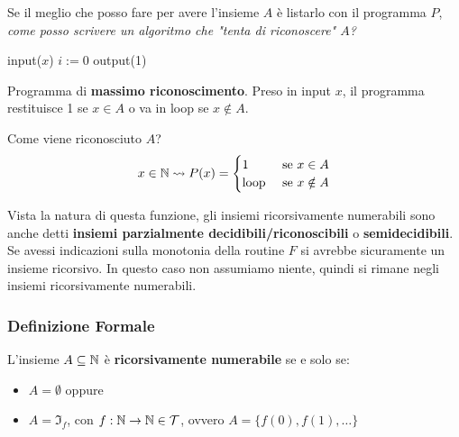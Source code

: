 Se il meglio che posso fare per avere l'insieme $A$ è listarlo con il programma $P$, \textit{come posso scrivere un algoritmo che "tenta di riconoscere" $A$?}

\vspace{1em}
\hspace{2em}
\begin{minipage}{.32\textwidth}
	\begin{tcolorbox}[
		colback=white,
		sharp corners,
		boxrule=.3mm,
		boxsep=0pt,
		left=20pt
		]
		\begin{algorithm}[H]
			\SetAlgoNoEnd
			input($x$)\;
			$i:=0$\;
			output(1)\;
		\end{algorithm}
	\end{tcolorbox}
\end{minipage}
\hspace{2em}
\begin{minipage}{.49\textwidth}
	Programma di \textbf{massimo riconoscimento}. Preso in input $x$, il programma restituisce 1 se $x\in A$ o va in loop se $x\notin A$.
\end{minipage}\vspace{1em}

Come viene riconosciuto $A$?
$$ x \in \mathbb{N} \rightsquigarrow P(x) = \begin{cases}
	1 & \text{ se } x \in A \\
	\text{loop} & \text{ se } x \notin A
\end{cases}$$

Vista la natura di questa funzione, gli insiemi ricorsivamente numerabili sono anche detti \textbf{insiemi parzialmente decidibili/riconoscibili} o \textbf{semidecidibili}. \\

Se avessi indicazioni sulla monotonia della routine $F$ si avrebbe sicuramente un insieme ricorsivo. In questo caso non assumiamo niente, quindi si rimane negli insiemi ricorsivamente numerabili.\\

\subsubsection{Definizione Formale}
L'insieme $A \subseteq \mathbb{N}$ è \textbf{ricorsivamente numerabile} se e solo se:
\begin{itemize}
	\item $A = \emptyset$ oppure
	\item $A = \Im_f$, con $f: \mathbb{N} \rightarrow \mathbb{N} \in \mathcal{T}$, ovvero $A = \{f(0), f(1), \dots\}$
\end{itemize}

